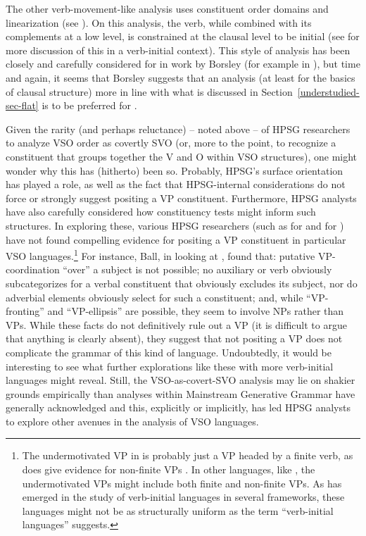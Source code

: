\documentclass[output=paper,biblatex,babelshorthands,newtxmath,draftmode,colorlinks,citecolor=brown]{langscibook}
\begin{document}
The other verb-movement-like analysis uses constituent order domains and linearization (see
). On this analysis, the verb, while combined
with its complements at a low level, is constrained at the clausal level to be initial (see
\citealt{borsley06} for more discussion of this in a verb-initial context). This style of analysis
has been closely and carefully considered for  in work by Borsley (for example in
\citealt{Borsley89b,borsley95,Borsley2009a-u}), but time and again, it seems that Borsley suggests
that an analysis (at least for the basics of clausal structure) more in line with what is discussed
in Section~\ref{understudied-sec-flat} is to be preferred for .

Given the rarity (and perhaps reluctance) -- noted above -- of HPSG researchers to analyze VSO order
as covertly SVO (or, more to the point, to recognize a constituent that groups together the V and O
within VSO structures), one might wonder why this has (hitherto) been so. Probably, HPSG's surface
orientation has played a role, as well as the fact that HPSG-internal considerations do not force or
strongly suggest positing a VP constituent. Furthermore, HPSG analysts have also carefully
considered how constituency tests might inform such structures. In exploring these, various HPSG
researchers (such as \citealt{borsley06} for  and \citealt[Chapter~3]{ball08thesis} for
) have not found compelling evidence for positing a VP constituent in particular VSO
languages.\footnote{The undermotivated VP in  is probably just a VP headed by a finite
  verb, as  does give evidence for non-finite VPs \citep{BTW07}. In other languages, like
  , the undermotivated VPs might include both finite and non-finite VPs. As has emerged
  in the study of verb-initial languages in several frameworks, these languages might not be as
  structurally uniform as the term ``verb-initial languages'' suggests.} For instance, Ball, in
looking at , found that: putative VP-coordination ``over'' a subject is not possible; no
auxiliary or verb obviously subcategorizes for a verbal constituent that obviously excludes its
subject, nor do adverbial elements obviously select for such a constituent; and, while ``VP-fronting'' and ``VP-ellipsis'' are
possible, they seem to involve NPs rather than VPs. While these facts do not definitively rule out a
VP (it is difficult to argue that anything is clearly absent), they suggest that not positing a VP
does not complicate the grammar of this kind of language. Undoubtedly, it would be interesting to
see what further explorations like these with more verb-initial languages might reveal. Still, the
VSO-as-covert-SVO analysis may lie on shakier grounds empirically than analyses within Mainstream
Generative Grammar have generally acknowledged and this, explicitly or implicitly, has led HPSG
analysts to explore other avenues in the analysis of VSO languages.%
\end{document}
